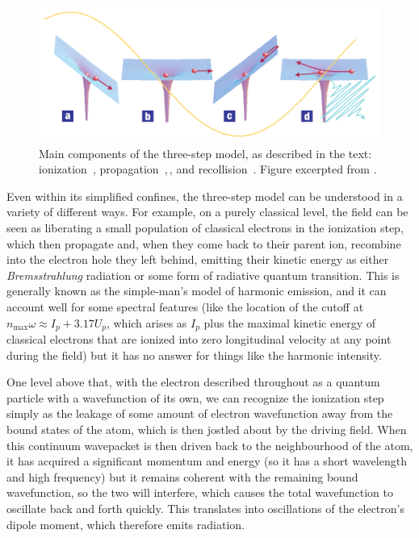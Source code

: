 \begin{figure}[htb]
  \centering
  \subfigure{\label{f7-corkum-three-step-model-a}}
  \subfigure{\label{f7-corkum-three-step-model-b}}
  \subfigure{\label{f7-corkum-three-step-model-c}}
  \subfigure{\label{f7-corkum-three-step-model-d}}
  \includegraphics[scale=1.2]{7-HHG-intro/Figures/figure7A.png}
  \caption[
  Essential components of the three-step model of HHG
  ]{
  Main components of the three-step model, as described in the text: ionization~\protect{}, propagation~\protect{},\,\protect{}, and recollision~\protect{}.
  Figure excerpted from .
  }
\label{f7-corkum-three-step-model}
\end{figure}


Even within its simplified confines, the three-step model can be understood in a variety of different ways. For example, on a purely classical level, the field can be seen as liberating a small population of classical electrons in the ionization step, which then propagate and, when they come back to their parent ion, recombine into the electron hole they left behind, emitting their kinetic energy as either \textit{Bremsstrahlung} radiation or some form of radiative quantum transition. This is generally known as the simple-man's model of harmonic emission, and it can account well for some spectral features (like the location of the cutoff at $n_\mathrm{max}\omega\approx I_p+3.17U_p$, which arises as $I_p$ plus the maximal kinetic energy of classical electrons that are ionized into zero longitudinal velocity at any point during the field) but it has no answer for things like the harmonic intensity.

One level above that, with the electron described throughout as a quantum particle with a wavefunction of its own, we can recognize the ionization step simply as the leakage of some amount of electron wavefunction away from the bound states of the atom, which is then jostled about by the driving field. When this continuum wavepacket is then driven back to the neighbourhood of the atom, it has acquired a significant momentum and energy (so it has a short wavelength and high frequency) but it remains coherent with the remaining bound wavefunction, so the two will interfere, which causes the total wavefunction to oscillate back and forth quickly. This translates into oscillations of the electron's dipole moment, which therefore emits radiation.



